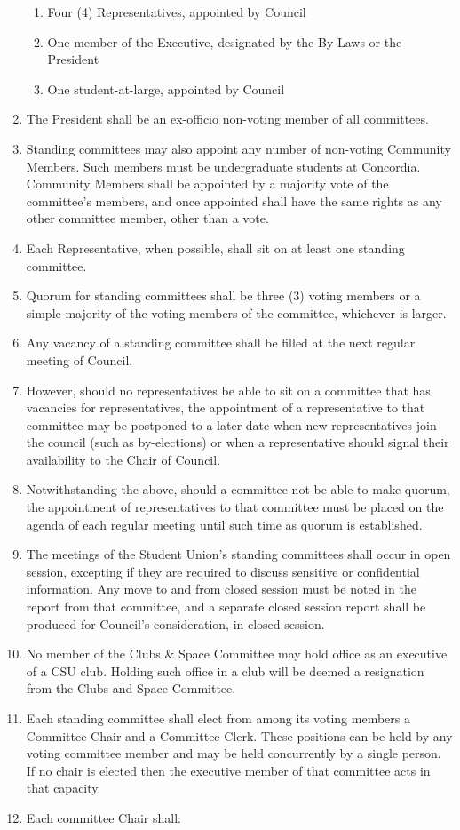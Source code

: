 \documentclass[oneside]{book}
\begin{document}
\begin{enumerate}
\begin{enumerate}
\item Four (4) Representatives, appointed by Council 
\item One member of the Executive, designated by the By-Laws or the President 
\item One student-at-large, appointed by Council 
\end{enumerate}
\item The President shall be an ex-officio non-voting member of all committees. 
\item Standing committees may also appoint any number of non-voting Community Members. 
Such members must be undergraduate students at Concordia. Community Members shall be 
appointed by a majority vote of the committee’s members, and once appointed shall have 
the same rights as any other committee member, other than a vote.
\item Each Representative, when possible, shall sit on at least one standing
committee. 
\item Quorum for standing committees shall be three (3) voting members or a simple majority 
of the voting members of the committee, whichever is larger. 
\item \label{committee-vacancy} Any vacancy of a standing committee shall be filled at the next regular
meeting of Council. 
\item However, should no representatives be able to sit on a committee that has vacancies for 
representatives, the appointment of a representative to that committee may be postponed to a 
later date when new representatives join the council (such as by-elections) or when a representative 
should signal their availability to the Chair of Council.
\item Notwithstanding the above, should a committee not be able to make quorum, the appointment of 
representatives to that committee must be placed on the agenda of each regular meeting until such 
time as quorum is established.
\item The meetings of the Student Union’s standing committees shall occur in open session, excepting 
if they are required to discuss sensitive or confidential information. Any move to and from closed 
session must be noted in the report from that committee, and a separate closed session report shall 
be produced for Council’s consideration, in closed session.
\item No member of the Clubs \& Space Committee may hold office as an executive 
of a CSU club. Holding such office in a club will be deemed a resignation from the 
Clubs and Space Committee. 
\item Each standing committee shall elect from among its voting members a Committee Chair 
and a Committee Clerk. These positions can be held by any voting committee 
member and may be held concurrently by a single person. If no chair is elected then the executive 
member of that committee acts in that capacity. 
\item \label{committee-chair-responsibilities} Each committee Chair shall: 


\end{enumerate}
\end{document}
